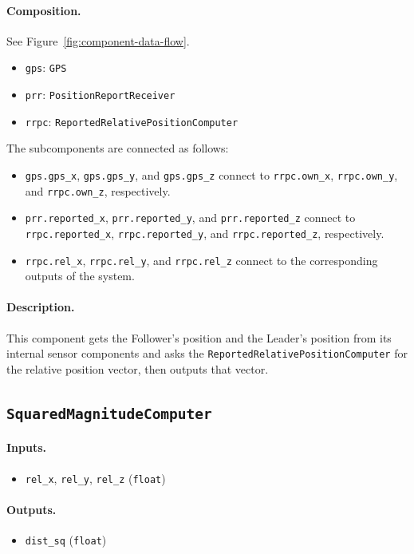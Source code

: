 \documentclass{article}
\begin{document}
\paragraph{Composition.}
See Figure~\ref{fig:component-data-flow}.
\begin{itemize}
    \item \verb|gps|: \verb|GPS|
    \item \verb|prr|: \verb|PositionReportReceiver|
    \item \verb|rrpc|: \verb|ReportedRelativePositionComputer|
\end{itemize}
The subcomponents are connected as follows:
\begin{itemize}
    \item \verb|gps.gps_x|, \verb|gps.gps_y|, and \verb|gps.gps_z| connect to
          \verb|rrpc.own_x|, \verb|rrpc.own_y|, and \verb|rrpc.own_z|, respectively.
    \item \verb|prr.reported_x|, \verb|prr.reported_y|, and
          \verb|prr.reported_z| connect to \verb|rrpc.reported_x|,
          \verb|rrpc.reported_y|, and \verb|rrpc.reported_z|, respectively.
    \item \verb|rrpc.rel_x|, \verb|rrpc.rel_y|, and \verb|rrpc.rel_z| connect
          to the corresponding outputs of the system.
\end{itemize}

\paragraph{Description.} This component gets the Follower's position and the Leader's position from its internal sensor components and asks the \texttt{ReportedRelativePositionComputer} for the relative position vector, then outputs that vector. 

\subsection{\texttt{SquaredMagnitudeComputer}}

\paragraph{Inputs.}
\begin{itemize}
    \item \verb|rel_x|, \verb|rel_y|, \verb|rel_z| (\verb|float|)
\end{itemize}

\paragraph{Outputs.}
\begin{itemize}
    \item \verb|dist_sq| (\verb|float|)
\end{itemize}
\end{document}
